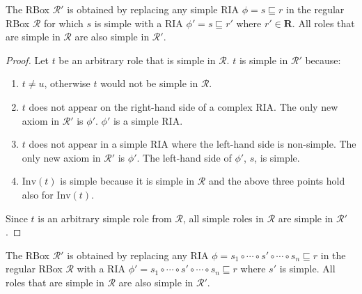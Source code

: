 \begin{lemma} \label{lem:simple-right}
The RBox $\mathcal{R}'$ is obtained by replacing any simple RIA $\phi = s \sqsubseteq r$ in the regular RBox $\mathcal{R}$ for which $s$ is simple with a RIA $\phi' = s \sqsubseteq r'$ where $r' \in \mathbf{R}$. All roles that are simple in $\mathcal{R}$ are also simple in $\mathcal{R}'$.
\end{lemma}

\begin{proof}
Let $t$ be an arbitrary role that is simple in $\mathcal{R}$.
$t$ is simple in $\mathcal{R}'$ because:
\begin{enumerate}[label=(\roman*)]
    \item  $t \not= u$, otherwise $t$ would not be simple in $\mathcal{R}$.
    \item $t$ does not appear on the right-hand side of a complex RIA. The only new axiom in $\mathcal{R}'$ is $\phi'$.  $\phi'$ is a simple RIA.
    \item $t$ does not appear in a simple RIA where the left-hand side is non-simple. The only new axiom in $\mathcal{R}'$ is $\phi'$. The left-hand side of $\phi'$, $s$, is simple.
    \item $\mathrm{Inv}(t)$ is simple because it is simple in $\mathcal{R}$ and the above three points hold also for $\mathrm{Inv}(t)$.
\end{enumerate}

Since $t$ is an arbitrary simple role from $\mathcal{R}$, all simple roles in $\mathcal{R}$ are simple in $\mathcal{R}'$.
\end{proof}

\begin{lemma} \label{lem:simple-left}
The RBox $\mathcal{R}'$ is obtained by replacing any RIA $\phi = s_1 \circ \cdots \circ s' \circ \cdots \circ s_n \sqsubseteq r$ in the regular RBox $\mathcal{R}$ with a RIA $\phi' = s_1 \circ \cdots \circ s' \circ \cdots \circ s_n \sqsubseteq r$ where $s'$ is simple. All roles that are simple in $\mathcal{R}$ are also simple in $\mathcal{R}'$.
\end{lemma}

